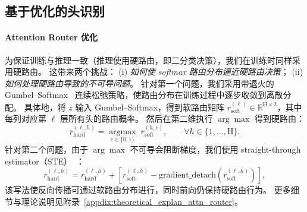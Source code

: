 \subsection{基于优化的头识别}
\label{subsec:head_identification_optimization}

\paragraph{Attention Router 优化}
为保证训练与推理一致（推理使用硬路由，即二分类决策），我们在训练时同样采用硬路由。
这带来两个挑战：
(i) \emph{如何使 softmax 路由分布逼近硬路由决策}；
(ii) \emph{如何处理硬路由导致的不可导问题}。
针对第一个问题，我们采用带退火的 Gumbel--Softmax~\citep{jang2016categorical} 连续松弛策略，使路由分布在训练过程中逐步收敛到离散分配。
具体地，将 $z$ 输入 Gumbel--Softmax，得到软路由矩阵 $r^{(\ell)}_{\mathrm{soft}} \in \mathbb{R}^\mathrm{{H\times 2}}$，其中每列对应第 $\ell$ 层所有头的路由概率。
然后在第二维执行 $\arg\max$ 得到硬路由：
\begin{equation}
r_{\mathrm{hard}}^{(\ell,h)}
=
\mathop{\mathrm{argmax}}\limits_{c \in \{0,1\}} \; r_{\mathrm{soft}}^{(h,c)}, 
\qquad \forall h \in \{1,\dots,\mathrm{H}\}.
\end{equation}
针对第二个问题，由于 $\arg\max$ 不可导会阻断梯度，我们使用 straight-through estimator（STE）~\citep{bengio2013estimating}：
\begin{equation}
    r_{\mathrm{hard}}^{(\ell,h)} = r_{\mathrm{hard}}^{(\ell,h)} + \left[r_\mathrm{soft}^{(\ell,h)} - \mathrm{gradient\_detach}\left(r_\mathrm{soft}^{(\ell,h)}\right)\right],
\end{equation}
该写法使反向传播可通过软路由分布进行，同时前向仍保持硬路由行为。
更多细节与理论说明见附录~\ref{appdix:theoretical_explan_attn_router}。



